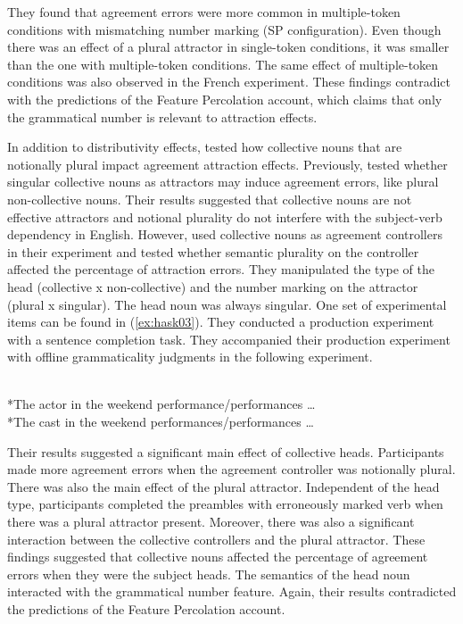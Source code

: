 They found that agreement errors were more common in multiple-token conditions with mismatching number marking (SP configuration). Even though there was an effect of a plural attractor in single-token conditions, it was smaller than the one with multiple-token conditions. The same effect of multiple-token conditions was also observed in the French experiment. These findings contradict with the predictions of the Feature Percolation account, which claims that only the grammatical number is relevant to attraction effects.

In addition to distributivity effects,  tested how collective nouns that are notionally plural impact agreement attraction effects. Previously,  tested whether singular collective nouns as attractors may induce agreement errors, like plural non-collective nouns. Their results suggested that collective nouns are not effective attractors and notional plurality do not interfere with the subject-verb dependency in English. However,  used collective nouns as agreement controllers in their experiment and tested whether semantic plurality on the controller affected the percentage of attraction errors. They manipulated the type of the head (collective x non-collective) and the number marking on the attractor (plural x singular). The head noun was always singular. One set of experimental items can be found in (\ref{ex:hask03}). They conducted a production experiment with a sentence completion task. They accompanied their production experiment with offline grammaticality judgments in the following experiment. 

\ea \label{ex:hask03}
  \\*The {actor} in the weekend {performance/performances} \ldots{} 
  \\*The {cast} in the weekend {performances/performances} \ldots{}  
  \z
\z

Their results suggested a significant main effect of collective heads. Participants made more agreement errors when the agreement controller was notionally plural. There was also the main effect of the plural attractor. Independent of the head type, participants completed the preambles with erroneously marked verb when there was a plural attractor present. Moreover, there was also a significant interaction between the collective controllers and the plural attractor. These findings suggested that collective nouns affected the percentage of agreement errors when they were the subject heads. The semantics of the head noun interacted with the grammatical number feature. Again, their results contradicted the predictions of the Feature Percolation account. 

